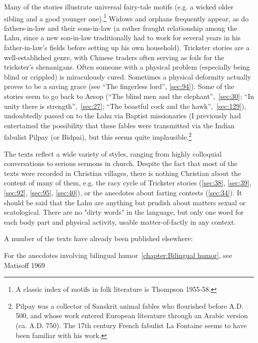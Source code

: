 Many of the stories illustrate universal fairy-tale motifs (e.g. a
wicked older sibling and a good younger one).\footnote{A classic index
  of motifs in folk literature is Thompson 1955-58.} Widows and
orphans frequently appear, as do fathers-in-law and their sons-in-law
(a rather fraught relationship among the Lahu, since a new son-in-law
traditionally had to work for several years in his father-in-law's
fields before setting up his own household). Trickster stories are a
well-established genre, with Chinese traders often serving as foils
for the trickster's shenanigans. Often someone with a physical problem
(especially being blind or crippled) is miraculously cured. Sometimes
a physical deformity actually proves to be a saving grace (see ``The
fingerless lord'', \ref{sec:94}). Some of the stories seem to go back
to Aesop (``The blind men and the elephant'',~\ref{sec:30}; ``In unity
there is strength'',~\ref{sec:27}; ``The boastful cock and the
hawk'',~\ref{sec:129}), undoubtedly passed on to the Lahu via Baptist
missionaries (I previously had entertained the possibility that these
fables were transmitted via the Indian fabulist Pilpay (or Bidpai),
but this seems quite implausible.\footnote{Pilpay was a collector of
  Sanskrit animal fables who flourished before A.D. 500, and whose
  work entered European literature through an Arabic version
  (ca. A.D. 750). The 17th century French fabulist La Fontaine seems
  to have been familiar with his work.}


\protect\hypertarget{anchor}{}{}The texts reflect a wide variety of
styles, ranging from highly colloquial conversations to serious
sermons in church. Despite the fact that most of the texts were
recorded in Christian villages, there is nothing Christian about the
content of many of them, e.g. the racy cycle of Trickster stories
(\ref{sec:38}, \ref{sec:39}, \ref{sec:92}, \ref{sec:95},
\ref{sec:40}), or the anecdotes about farting contests
(\ref{sec:34}). It should be said that the Lahu are anything but
prudish about matters sexual or scatological. There are no "dirty
words" in the language, but only one word for each body part and
physical activity, usable matter-of-factly in any context.

A number of the texts have already been published elsewhere:

For the anecdotes involving bilingual humor~\ref{chapter:Bilingual humor}, see Matisoff 1969

